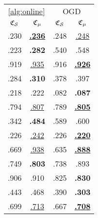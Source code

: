 \begin{tabular}{||@{\ }c@{\ }c@{\ }|@{\ }c@{\ }c}
\toprule
\multicolumn{2}{c}{\cref{alg:online}} & \multicolumn{2}{c}{OGD} \\
{\scriptsize $\mathfrak{C}_{\mathcal{S}}$} & {\scriptsize $\mathfrak{C}_{\mu}$} & {\scriptsize $\mathfrak{C}_{\mathcal{S}}$} & {\scriptsize $\mathfrak{C}_{\mu}$} \\
\midrule
.230 & \underline{{\bf .236}} & .248 & \underline{.248} \\
.223 & {\bf .282} & .540 & .548 \\
.919 & \underline{.935} & .916 & \underline{{\bf .926}} \\
.284 & {\bf .310} & .378 & .397 \\
.218 & .222 & .082 & {\bf .087} \\
.794 & \underline{.807} & .789 & \underline{{\bf .805}} \\
.342 & {\bf .484} & .589 & .600 \\
.226 & \underline{.242} & .226 & \underline{{\bf .220}} \\
.669 & \underline{.938} & .635 & \underline{{\bf .888}} \\
.749 & {\bf .803} & .738 & .893 \\
.906 & .910 & .825 & {\bf .830} \\
.443 & .468 & .390 & {\bf .303} \\
.699 & \underline{.713} & .667 & \underline{{\bf .708}} \\
\bottomrule
\end{tabular}
